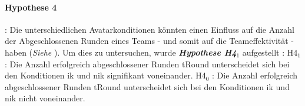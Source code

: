 \documentclass[a4paper,11pt]{article}%
\renewcommand{\\}{\vspace*{0.5\baselineskip} \newline}
\begin{document}
\paragraph{Hypothese 4}:
Die unterschiedlichen Avatarkonditionen könnten einen Einfluss auf die Anzahl der Abgeschlossenen Runden eines Teams - und somit auf die Teameffektivität - haben (\textit{Siehe }). Um dies zu untersuchen, wurde \textbf{\textit{Hypothese H4$_{1}$}} aufgestellt :\\
H4$_{1}$ : Die Anzahl erfolgreich abgeschlossener Runden \ac{tRound} unterscheidet sich bei den Konditionen \ac{ik} und \ac{nik} signifikant voneinander. \newline
H4$_{0}$ : Die Anzahl erfolgreich abgeschlossener Runden \ac{tRound} unterscheidet sich bei den Konditionen \ac{ik} und \ac{nik} nicht voneinander. \\
%	
\end{document}
